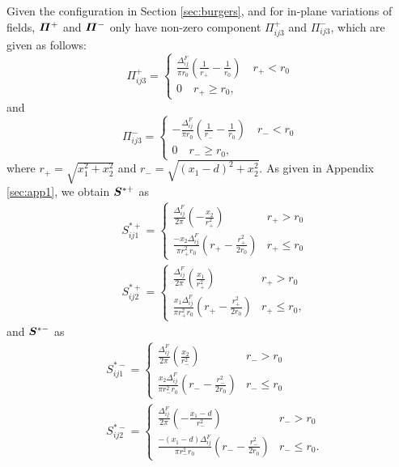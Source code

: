 \documentclass[11pt,letterpaper]{article}
\begin{document}
Given the configuration in Section \ref{sec:burgers}, and for in-plane variations of fields, $\bfPi^+$ and $\bfPi^-$ only have non-zero component $\Pi^+_{ij3}$ and $\Pi^-_{ij3}$, which are given as follows:
\begin{equation*}
\Pi^+_{ij3} = 
\begin{cases}
\frac{\Delta^F_{ij}}{\pi r_0} \left( \frac{1}{r_+} - \frac{1}{r_0} \right) \quad \text{$r_+ < r_0$} \\
0 \quad \text{$r_+ \ge r_0$},
\end{cases}
\end{equation*} 
and
\begin{equation*}
\Pi^-_{ij3} = 
\begin{cases}
-\frac{\Delta^F_{ij}}{\pi r_0} \left( \frac{1}{r_-} - \frac{1}{r_0} \right) \quad \text{$r_- < r_0$} \\
0 \quad \text{$r_- \ge r_0$},
\end{cases}
\end{equation*} 
where $r_+=\sqrt{x_1^2+x_2^2}$ and $r_-=\sqrt{(x_1-d)^2+x_2^2}$. As given in Appendix \ref{sec:app1},  we obtain $\bfS^{*+}$ as 
 \begin{eqnarray*}
&S^{*+}_{ij1} =
\begin{cases}
\frac{\Delta^F_{ij}}{2\pi}(-\frac{x_2}{r_+^2}) & r_+>r_0 \\
\frac{-x_2 \Delta^F_{ij}}{\pi r_+^2 r_0} (r_+-\frac{r_+^2}{2r_0}) & r_+ \le r_0
\end{cases} \\
&S^{*+}_{ij2} =
\begin{cases}
\frac{\Delta^F_{ij}}{2\pi}(\frac{x_1}{r_+^2}) & r_+>r_0 \\
\frac{x_1 \Delta^F_{ij}}{\pi r_+^2 r_0} (r_+-\frac{r_+^2}{2r_0})& r_+ \le r_0,
\end{cases}
\end{eqnarray*}
and $\bfS^{*-}$ as 
 \begin{eqnarray*}
&S^{*-}_{ij1} =
\begin{cases}
\frac{\Delta^F_{ij}}{2\pi}(\frac{x_2}{r_-^2}) & r_->r_0 \\
\frac{x_2 \Delta^F_{ij}}{\pi r_-^2 r_0} (r_--\frac{r_-^2}{2r_0}) & r_- \le r_0
\end{cases} \\
&S^{*-}_{ij2} =
\begin{cases}
\frac{\Delta^F_{ij}}{2\pi}(-\frac{x_1-d}{r_-^2}) & r_->r_0 \\
\frac{-(x_1-d) \Delta^F_{ij}}{\pi r_-^2 r_0} (r_--\frac{r_-^2}{2r_0})& r_- \le r_0.
\end{cases}
\end{eqnarray*}
\end{document}
